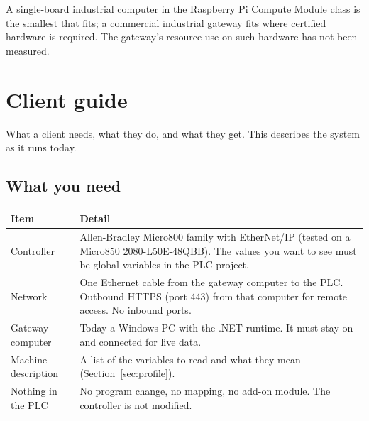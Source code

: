 \documentclass[a4paper,10.5pt]{article}
\begin{document}
\medskip
A single-board industrial computer in the Raspberry Pi Compute Module class is the smallest that fits; a
commercial industrial gateway fits where certified hardware is required. The gateway's resource use on such
hardware has not been measured.


\section{Client guide}

What a client needs, what they do, and what they get. This describes the system as it runs today.

\subsection{What you need}
\begin{tabularx}{\textwidth}{@{}>{\raggedright\arraybackslash}p{36mm}Y@{}}
\toprule
\textbf{Item} & \textbf{Detail} \\
\midrule
Controller & Allen-Bradley Micro800 family with EtherNet/IP (tested on a Micro850 2080-L50E-48QBB). The values you want to see must be global variables in the PLC project. \\
Network & One Ethernet cable from the gateway computer to the PLC. Outbound HTTPS (port 443) from that computer for remote access. No inbound ports. \\
Gateway computer & Today a Windows PC with the .NET runtime. It must stay on and connected for live data. \\
Machine description & A list of the variables to read and what they mean (Section~\ref{sec:profile}). \\
Nothing in the PLC & No program change, no mapping, no add-on module. The controller is not modified. \\
\bottomrule
\end{tabularx}
\end{document}

